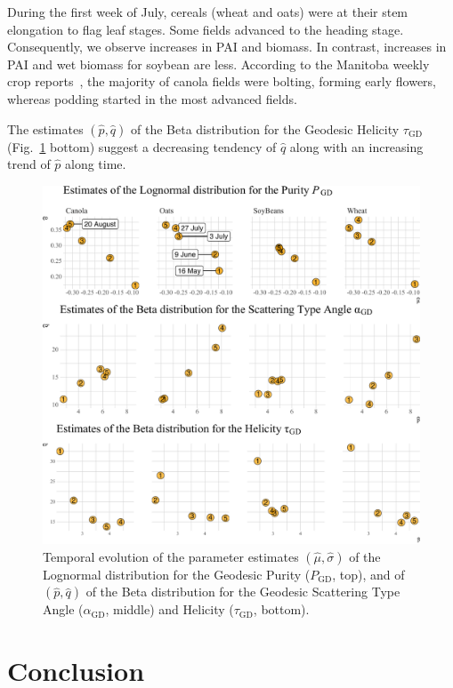 \documentclass[journal]{IEEEtran}
\begin{document}
	During the first week of July, cereals (wheat and oats) were at their stem elongation to flag leaf stages. Some fields advanced to the heading stage. Consequently, we observe increases in PAI and biomass. 
	In contrast, increases in PAI and wet biomass for soybean are less. According to the Manitoba weekly crop reports~\cite{manitobaagriculture}, the majority of canola fields were bolting, forming early flowers, whereas podding started in the most advanced fields.
	
	The estimates $(\widehat p, \widehat q)$ of the Beta distribution for the Geodesic Helicity $\tau_{\text{GD}}$ (Fig.~\ref{fig:TemporalIndexes} bottom) suggest a decreasing tendency of $\widehat q$ along with an increasing trend of $\widehat p$ along time.
	
	\begin{figure}
		\centering
		\includegraphics[width=\columnwidth]{TemporalIndexes}
		\caption{Temporal evolution of the parameter estimates $(\widehat\mu,\widehat\sigma)$ of the Lognormal distribution for the Geodesic Purity ($P_{\text{GD}}$, top), and of $(\widehat p,\widehat q)$ of the Beta distribution for the Geodesic Scattering Type Angle ($\alpha_{\text{GD}}$, middle) and Helicity ($\tau_{\text{GD}}$, bottom).}\label{fig:TemporalIndexes}
	\end{figure}
	
	\section{Conclusion}
	
\end{document}
